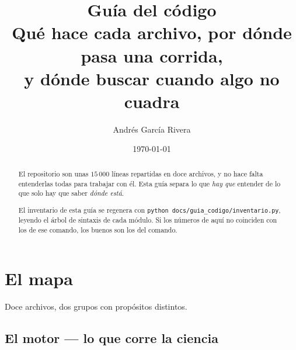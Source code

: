 \documentclass[11pt,a4paper]{article}
\title{\bfseries Guía del código\\[.3em]
  \large Qué hace cada archivo, por dónde pasa una corrida,\\
  y dónde buscar cuando algo no cuadra}
\author{Andrés García Rivera}
\date{\today}
\newcommand{\M}[1]{\texttt{#1}}
\begin{document}
\maketitle

\begin{abstract}
\noindent
El repositorio son unas $15\,000$ líneas repartidas en doce archivos, y no
hace falta entenderlas todas para trabajar con él. Esta guía separa lo que
\emph{hay que} entender de lo que solo hay que saber \emph{dónde está}.

\medskip\noindent
El inventario de esta guía se regenera con
\M{python docs/guia\_codigo/inventario.py}, leyendo el árbol de sintaxis de
cada módulo. Si los números de aquí no coinciden con los de ese comando, los
buenos son los del comando.
\end{abstract}

\tableofcontents
\bigskip

\section{El mapa}

Doce archivos, dos grupos con propósitos distintos.

\subsection{El motor — lo que corre la ciencia}
\end{document}
